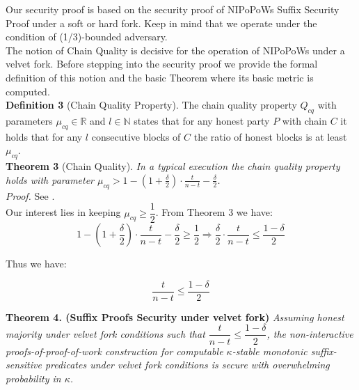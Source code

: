 Our security proof is based on the security proof of NIPoPoWs Suffix Security Proof
under a soft or hard fork. Keep in mind that we operate under the condition of
(1/3)-bounded adversary.\\

The notion of Chain Quality is decisive for the operation of NIPoPoWs under a
velvet fork. Before stepping into the security proof we provide the formal
definition of this notion and the basic Theorem where its basic metric is computed.\\

\textbf{Definition 3 }(Chain Quality Property)\cite{Backbone}. The chain quality
property $Q_{cq}$ with parameters $\mu_{cq} \in \mathbb{R}$ and $l \in \mathbb{N}$
states that for any honest party $P$ with chain $C$ it holds that for any
$l $ consecutive blocks of $C$ the ratio of honest blocks is at least $\mu_{cq}$.\\

\textbf{Theorem 3 }(Chain Quality)\cite{Backbone}. \textit{In a typical execution
the chain quality property holds with parameter $\mu_{cq} > 1 - (1 + \frac{\delta}{2})
\cdot \frac{t}{n-t} - \frac{\delta}{2}$.}\\
\textit{Proof.} See \cite{Backbone}.\\

Our interest lies in keeping $\mu_{cq} \geq \dfrac{1}{2}$.
From Theorem 3 we have:
\begin{equation*}
1 - (1 + \frac{\delta}{2}) \cdot \frac{t}{n-t} - \frac{\delta}{2} \geq \dfrac{1}{2} \Rightarrow 
\frac{\delta}{2} \cdot \frac{t}{n-t} \leq \frac{1-\delta}{2}
\end{equation*}

Thus we have:
\begin{center}
\begin{equation}
\dfrac{t}{n-t} \leq \dfrac{1-\delta}{2}
\end{equation}
\end{center}


\textbf{Theorem 4. (Suffix Proofs Security under velvet fork)} \textit{Assuming honest majority
under velvet fork conditions such that $\dfrac{t}{n-t} \leq \dfrac{1-\delta}{2}$,
the non-interactive proofs-of-proof-of-work construction for computable
$\kappa$-stable monotonic suffix-sensitive predicates under velvet fork conditions
is secure with overwhelming probability in $\kappa$.}\\

